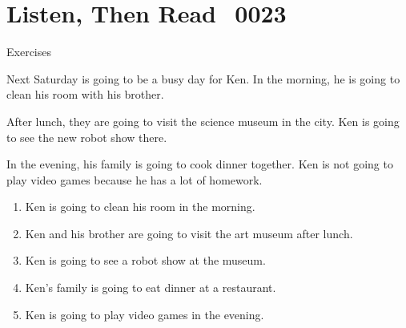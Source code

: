 \documentclass[aspectratio=169,xcolor={dvipsnames,table}]{beamer}
\newcommand{\myaudio}[1]{\href{#1}{\faVolumeUp}}
\begin{document}
\section{Listen, Then Read\,\,\,\,\,{\tiny 0023}\,{\scriptsize \myaudio{./audio/011_be_going_to_reading.mp3}}}
\begin{frame}[plain,t]{Exercises}
\begin{tcolorbox}[colframe=ForestGreen,
  colback=NavyBlue!10!white,
  colbacktitle=NavyBlue!40!white,
  coltitle=black, %
before upper={\setlength{\parindent}{1.25em}},
 title={A Busy Weekend\hfill{\tiny 0023}\quad{\scriptsize \myaudio{./audio/011_be_going_to_reading.mp3}}}
]
Next Saturday is going to be a busy day for Ken.
In the morning, he is going to clean his room with his brother.

After lunch, they are going to visit the science museum in the city.
Ken is going to see the new robot show there.

In the evening, his family is going to cook dinner together.
Ken is not going to play video games because he has a lot of homework.
\end{tcolorbox}

\vspace{-4pt}
\vspace{-11pt}
\begin{enumerate}\setlength{\itemsep}{-3.2pt}
\item<2-> Ken is going to clean his room in the morning.\hfill{}
\item<2-> Ken and his brother are going to visit the art museum after lunch.\hfill{}
\item<2-> Ken is going to see a robot show at the museum.\hfill{}
\item<2-> Ken's family is going to eat dinner at a restaurant.\hfill{}
\item<2-> Ken is going to play video games in the evening.\hfill{}
\end{enumerate}
\end{frame}
\end{document}

